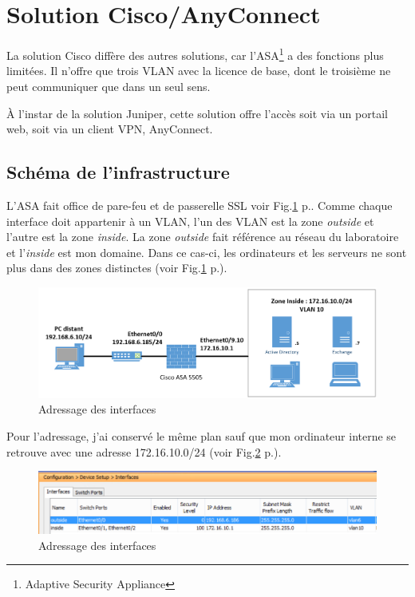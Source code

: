 \section{Solution Cisco/AnyConnect}
La solution Cisco diffère des autres solutions, car l'ASA\footnote{Adaptive Security Appliance} a des fonctions plus limitées.
Il n'offre que trois VLAN avec la licence de base, dont le troisième ne peut communiquer que dans un seul sens.

À l'instar de la solution Juniper, cette solution offre l'accès soit via un portail web, soit via un client VPN, AnyConnect.

\subsection{Schéma de l'infrastructure}
L'ASA fait office de pare-feu et de passerelle SSL voir Fig.\ref{fig:schemaCisco} p.\pageref{fig:schemaCisco}.
Comme chaque interface doit appartenir à un VLAN, l'un des VLAN est la zone \textit{outside} et l'autre est la zone \textit{inside}.
La zone \textit{outside} fait référence au réseau du laboratoire et l'\textit{inside} est mon domaine.
Dans ce cas-ci, les ordinateurs et les serveurs ne sont plus dans des zones distinctes (voir Fig.\ref{fig:schemaCisco} p.\pageref{fig:schemaCisco}).
\begin{figure}[ht]
	\centering
	\includegraphics[width=16cm]{Cisco/schema.png}
	\caption{Adressage des interfaces}
	\label{fig:schemaCisco}
\end{figure}
Pour l'adressage, j'ai conservé le même plan sauf que mon ordinateur interne se retrouve avec une adresse 172.16.10.0/24 (voir Fig.\ref{fig:ifCisco} p.\pageref{fig:ifCisco}).
\begin{figure}[ht]
	\centering
	\includegraphics[width=16cm]{Cisco/interfaces.png}
	\caption{Adressage des interfaces}
	\label{fig:ifCisco}
\end{figure}

